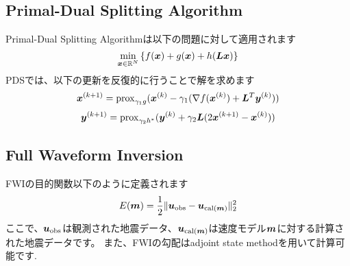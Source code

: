 \subsection{Primal-Dual Splitting Algorithm}\label{subsec:primal-dual-splitting-algorithm}
Primal-Dual Splitting Algorithm\cite{PDS0,PDS1,PDS2,PDS3}は以下の問題に対して適用されます
\begin{equation} \label{eq:PDSPrimalEq} \underset{ \bm{x} \in \mathbb{R}^N }{\mathrm{min}} \left\{ f(\bm{x}) + g(\bm{x}) + h(\bm{L} \bm{x}) \right\} \end{equation}
PDSでは、以下の更新を反復的に行うことで解を求めます
\begin{equation} \label{eq:PDSSubStepX} \bm{x}^{(k+1)} = \mathrm{prox}_{\gamma_1 g}(\bm{x}^{(k)} - \gamma_1( \nabla f(\bm{x}^{(k)}) + \bm{L}^T \bm{y}^{(k)} )) \end{equation}
\begin{equation} \label{eq:PDSSubStepY} \bm{y}^{(k+1)} = \mathrm{prox}_{\gamma_2 h^*}(\bm{y}^{(k)} + \gamma_2 \bm{L} (2\bm{x}^{(k+1)} - \bm{x}^{(k)}) ) \end{equation}

\subsection{Full Waveform Inversion}\label{subsec:full-waveform-inversion}

FWIの目的関数以下のように定義されます
\begin{equation} \label{eq:FWIObjective} E(\bm{m}) = \frac {1} {2} \lVert  \bm{u}_{\mathrm{obs}} - \bm{u}_{\mathrm{cal}(\bm{m})}  \rVert _2^2 \end{equation}
ここで、$\bm{u}_{\mathrm{obs}}$は観測された地震データ、$\bm{u}_{\mathrm{cal}(\bm{m})}$は速度モデル$\bm{m}$に対する計算された地震データです。
また、FWIの勾配はadjoint state methodを用いて計算可能です\cite{FWI-gradient}.
